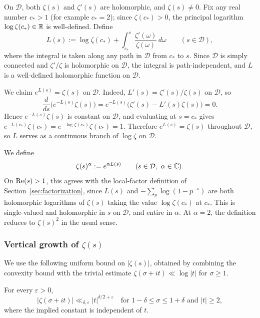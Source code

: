 On $\mathcal{D}$, both $\zeta(s)$ and $\zeta'(s)$ are holomorphic,
and $\zeta(s) \neq 0$. Fix any real number $c_* > 1$ (for
example $c_* = 2$); since $\zeta(c_*) > 0$, the principal
logarithm $\log \zeta(c_*) \in \mathbb{R}$ is well-defined. Define
\begin{equation}\label{eq:L-def}
    L(s) := \log \zeta(c_*)
          + \int_{c_*}^{s} \frac{\zeta'(\omega)}{\zeta(\omega)}\, d\omega
    \qquad (s \in \mathcal{D}),
\end{equation}
where the integral is taken along any path in $\mathcal{D}$ from
$c_*$ to $s$. Since $\mathcal{D}$ is simply connected and
$\zeta'/\zeta$ is holomorphic on $\mathcal{D}$, the integral is
path-independent, and $L$ is a well-defined holomorphic function
on $\mathcal{D}$.

We claim $e^{L(s)} = \zeta(s)$ on $\mathcal{D}$. Indeed,
$L'(s) = \zeta'(s)/\zeta(s)$ on $\mathcal{D}$, so
\[
    \frac{d}{ds}\!\bigl(e^{-L(s)} \zeta(s)\bigr)
    = e^{-L(s)} \bigl(\zeta'(s) - L'(s) \zeta(s)\bigr)
    = 0.
\]
Hence $e^{-L(s)} \zeta(s)$ is constant on $\mathcal{D}$, and
evaluating at $s = c_*$ gives
$e^{-L(c_*)} \zeta(c_*) = e^{-\log\zeta(c_*)} \zeta(c_*) = 1$.
Therefore $e^{L(s)} = \zeta(s)$ throughout $\mathcal{D}$, so $L$
serves as a continuous branch of $\log \zeta$ on $\mathcal{D}$.

We define
\begin{equation}\label{eq:zeta-alpha-def}
    \zeta(s)^\alpha := e^{\alpha L(s)}
    \qquad (s \in \mathcal{D},\ \alpha \in \mathbb{C}).
\end{equation}
On $\operatorname{Re}(s) > 1$, this agrees with the local-factor definition of
Section~\ref{sec:factorization}, since $L(s)$ and
$-\sum_p \log(1 - p^{-s})$ are both holomorphic logarithms of
$\zeta(s)$ taking the value $\log\zeta(c_*)$ at $c_*$.
This is single-valued and holomorphic in $s$ on $\mathcal{D}$,
and entire in $\alpha$. At $\alpha = 2$, the definition reduces
to $\zeta(s)^2$ in the usual sense.

\subsubsection*{Vertical growth of \texorpdfstring{$\zeta(s)$}{zeta(s)}}

We use the following uniform bound on $|\zeta(s)|$, obtained by
combining the convexity bound with the trivial estimate
$\zeta(\sigma + it) \ll \log |t|$ for $\sigma \geq 1$.

\begin{theorem}
\label{thm:zeta-uniform}
For every $\varepsilon > 0$,
\begin{equation}\label{eq:zeta-uniform}
    |\zeta(\sigma + it)| \ll_{\delta, \varepsilon}
    |t|^{\delta/2 + \varepsilon}
    \quad \text{for } 1 - \delta \leq \sigma \leq 1 + \delta
    \text{ and } |t| \geq 2,
\end{equation}
where the implied constant is independent of $t$.
\end{theorem}

